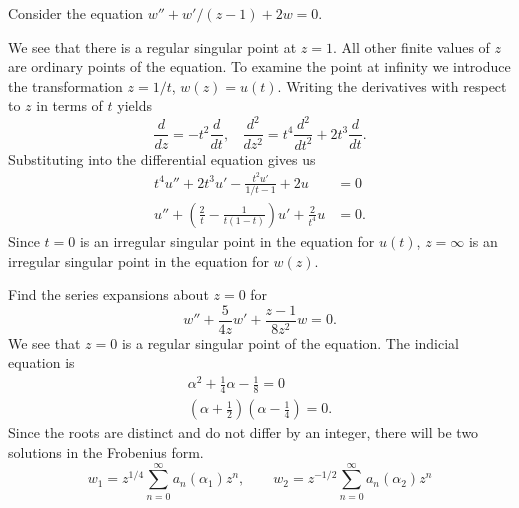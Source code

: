 {%
\begin{Solution}
  \label{solution wwz12w=0}
  Consider the equation $w'' + w'/(z-1) + 2w = 0$.

  We see that there is a regular singular point at $z=1$.  All other finite
  values of $z$ are ordinary points of the equation.  To examine the point at
  infinity we introduce the transformation $z = 1/t$, $w(z) = u(t)$.  Writing
  the derivatives with respect to $z$ in terms of $t$ yields
  \[      \frac{d}{dz} = -t^2 \frac{d}{dt},\ \ \ \
  \frac{d^2}{dz^2} = t^4 \frac{d^2}{dt^2} + 2t^3 \frac{d}{dt}. \]
  Substituting into the differential equation gives us
  \begin{align*}
    t^4 u'' + 2t^3 u' - \frac{t^2 u'}{1/t-1} + 2u &= 0 \\
    u'' + \left(\frac{2}{t} - \frac{1}{t(1-t)}\right)u'
    + \frac{2}{t^4} u &= 0.
  \end{align*}
  Since $t = 0$ is an irregular singular point in the equation for $u(t)$,
  $z = \infty$ is an irregular singular point in the equation for $w(z)$.
\end{Solution}













\begin{Solution}
  \label{solution w54zwz18zw=0}
  Find the series expansions about $z = 0$ for
  \[      w'' + \frac{5}{4z} w' + \frac{z-1}{8z^2} w = 0. \]
  We see that $z=0$ is a regular singular point of the equation.
  The indicial equation is
  \begin{gather*}
    \alpha^2 + \frac{1}{4}\alpha - \frac{1}{8} = 0 \\
    \left( \alpha + \frac{1}{2} \right) \left( \alpha - \frac{1}{4} \right) = 0.
  \end{gather*}
  Since the roots are distinct and do not differ by an integer, there will
  be two solutions in the Frobenius form.
  \[ w_1 = z^{1/4} \sum_{n=0}^\infty a_n(\alpha_1) z^n, \qquad
  w_2 = z^{-1/2} \sum_{n=0}^\infty a_n(\alpha_2) z^n \]


\end{Solution}}

